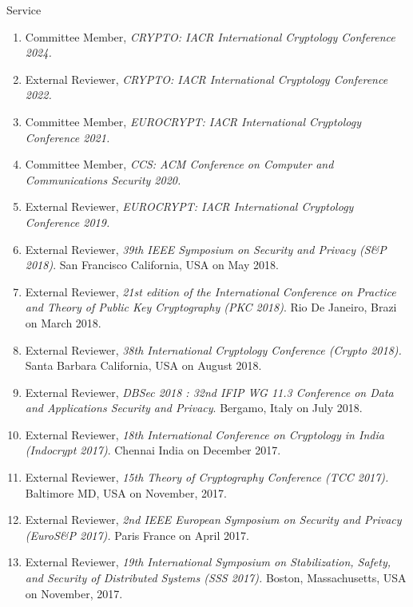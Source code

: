 \documentclass{resume} %
\begin{document}

\begin{rSection}{Service}
	
	\begin{enumerate}[label=E\arabic* --]
		\item Committee Member,  \emph{CRYPTO: IACR International Cryptology Conference 2024. }
		
		\item External Reviewer,  \emph{CRYPTO: IACR International Cryptology Conference 2022. }
		
		\item Committee Member,  \emph{EUROCRYPT: IACR International Cryptology Conference 2021. }
		
		\item Committee Member,  \emph{CCS: ACM Conference on Computer and Communications Security 2020. }
		
		\item External Reviewer,  \emph{EUROCRYPT: IACR International Cryptology Conference 2019. }
		
		\item External Reviewer,  \emph{39th IEEE Symposium on Security and Privacy (S\&P 2018)}. San Francisco California, USA on May 2018.
		
		\item External Reviewer,  \emph{21st edition of the International Conference on Practice and Theory of Public Key Cryptography (PKC 2018)}. Rio De Janeiro, Brazi on March 2018.
		
		\item External Reviewer,  \emph{38th International Cryptology Conference (Crypto 2018).} Santa Barbara California, USA on August 2018.
		
		\item External Reviewer,  \emph{DBSec 2018 : 32nd IFIP WG 11.3 Conference on Data and Applications Security and Privacy}.  Bergamo, Italy on July 2018.
		
		\item External Reviewer,  \emph{18th International Conference on Cryptology in India (Indocrypt 2017)}. Chennai India on December 2017.
		
		\item External Reviewer, \emph{15th Theory of Cryptography Conference (TCC 2017).}  Baltimore MD, USA on November, 2017.
		
		\item External Reviewer, \emph{2nd IEEE European Symposium on Security and Privacy (EuroS\&P 2017).} Paris France on April 2017.
		
		\item External Reviewer, \emph{19th International Symposium on Stabilization, Safety, and Security of Distributed Systems (SSS 2017).} Boston, Massachusetts, USA on November, 2017.
	\end{enumerate}
	
\end{rSection}
\end{document}
